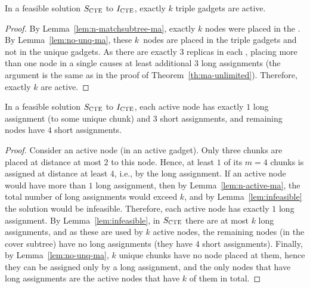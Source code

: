 \begin{lemma}
  In a feasible solution $S_{\mathrm{\textsc{CTE}}}$ to $I_{\mathrm{\textsc{CTE}}}$, exactly $k$ triple gadgets are active.
  \label{lem:n-active-ma}
\end{lemma}
\begin{proof}
  By Lemma~\ref{lem:n-matchsubtree-ma}, exactly $k$ nodes were placed in the \MatchSubtree{}.
  By Lemma~\ref{lem:no-unq-ma}, these $k$~nodes are placed in the triple gadgets and not in the unique gadgets.
As there are exactly $3$ replicas in each \TripleGadget{}, placing more than one node in a single \TripleGadget{} causes at least additional $3$ long assignments (the argument is the same as in the proof of Theorem~\ref{th:ma-unlimited}).
Therefore, exactly $k$ \TripleGadgets{} are active.
\end{proof}

\begin{lemma}
  In a feasible solution $S_{\mathrm{\textsc{CTE}}}$ to $I_{\mathrm{\textsc{CTE}}}$, each active node has exactly $1$ long assignment (to some unique chunk) and $3$ short assignments, and remaining nodes have $4$ short assignments.
  \label{lem:assignment-length}
\end{lemma}
\begin{proof}
  Consider an active node (in an active gadget). Only three chunks are placed at distance at most $2$ to this node. Hence, at least $1$ of its $m = 4$ chunks is assigned at distance at least $4$, i.e., by the long assignment.
  If an active node would have more than $1$ long assignment, then by Lemma~\ref{lem:n-active-ma}, the total number of long assignments would exceed $k$, and by Lemma~\ref{lem:infeasible} the solution would be infeasible.
  Therefore, each active node has exactly $1$ long assignment.
  By Lemma~\ref{lem:infeasible}, in $S_{\mathrm{\textsc{CTE}}}$ there are at most $k$ long assignments, and as these are used by $k$ active nodes, the remaining nodes (in the cover subtree) have no long assignments (they have $4$ short assignments).
  Finally, by Lemma~\ref{lem:no-unq-ma}, $k$ unique chunks have no node placed at them, hence they can be assigned only by a long assignment, and the only nodes that have long assignments are the active nodes that have $k$ of them in total.
\end{proof}

